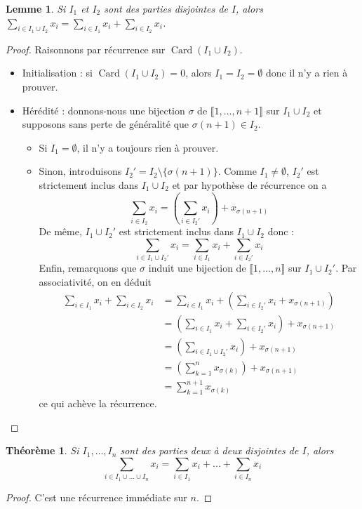 \documentclass[french]{book}
\theoremstyle{plain}
\newtheorem{thm}{Théorème}[chapter]
\newtheorem{lem}{Lemme}[chapter]
\theoremstyle{definition}
\theoremstyle{remark}
\DeclareMathOperator{\card}{Card}
\begin{document}
\begin{lem}
	Si $I_{1}$ et $I_{2}$ sont des parties disjointes de $I$, alors $\displaystyle\sum_{i\in I_{1}\cup I_{2}}x_{i}=\sum_{i\in I_{1}}x_{i}+\sum_{i\in I_{2}}x_{i}$.
\end{lem}
\begin{proof}
	Raisonnons par récurrence sur $\card(I_1 \cup I_2)$.
	\begin{itemize}
		\item Initialisation : si $\card(I_1 \cup I_2) = 0$, alors $I_1 = I_2 = \emptyset$ donc il n'y a rien à prouver.
		\item Hérédité : donnons-nous une bijection $\sigma$ de $\llbracket1,\ldots, n+1\rrbracket$ sur $I_1 \cup I_2$ et supposons sans perte de généralité que $\sigma(n+1) \in I_2$.
		\begin{itemize}
			\item[--] Si $I_1 = \emptyset$, il n'y a toujours rien à prouver.
			\item[--] Sinon, introduisons $I_2' = I_2 \setminus \{\sigma(n+1)\}$. Comme $I_1 \neq \emptyset$, $I_2'$ est strictement inclus dans $I_1 \cup I_2$ et par hypothèse de récurrence on a $$\sum_{i \in I_2} x_i = \left(\sum_{i \in I_2'} x_i\right) + x_{\sigma(n+1)}$$
			De même, $I_1 \cup I_2'$ est strictement inclus dans $I_1 \cup I_2$ donc : $$\sum_{i \in I_1 \cup I_2'} x_i = \sum_{i \in I_1} x_i + \sum_{i \in I_2'} x_i$$
			Enfin, remarquons que $\sigma$ induit une bijection de $\llbracket1,\ldots,n\rrbracket$ sur $I_1 \cup I_2'$. Par associativité, on en déduit
			\begin{align*}
				\sum_{i \in I_1} x_i + \sum_{i \in I_2} x_i &= \sum_{i \in I_1} x_i + \left(\sum_{i \in I_2'} x_i + x_{\sigma(n+1)}\right)\\
				&= \left(\sum_{i \in I_1} x_i + \sum_{i \in I_2'} x_i\right) + x_{\sigma(n+1)}\\
				&= \left(\sum_{i \in I_1 \cup I_2'} x_i\right) + x_{\sigma(n+1)}\\
				&= \left(\sum_{k=1}^n x_{\sigma(k)}\right) + x_{\sigma(n+1)}\\
				&= \sum_{k=1}^{n+1} x_{\sigma(k)}
			\end{align*}
			ce qui achève la récurrence.
		\end{itemize}
	\end{itemize}
\end{proof}
\begin{thm}
	Si $I_1,\ldots, I_n$ sont des parties deux à deux disjointes de $I$, alors $$\sum_{i \in I_1 \cup ... \cup I_n} x_i = \sum_{i \in I_1} x_i + ... + \sum_{i \in I_n} x_i$$
\end{thm}
\begin{proof}
	C'est une récurrence immédiate sur $n$.
\end{proof}
\end{document}
